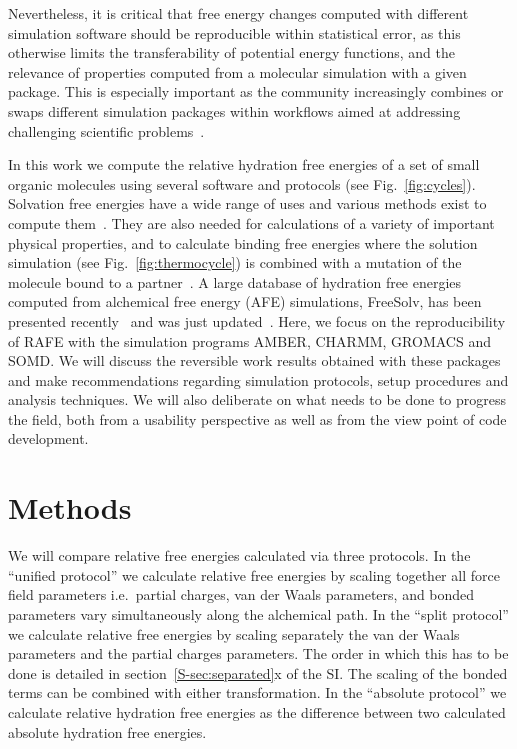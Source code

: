 \documentclass[journal=jctcce,manuscript=article]{achemso}
\begin{document}
Nevertheless, it is critical that free energy
changes computed with different simulation software should be reproducible
within statistical error, as this otherwise limits the transferability of
potential energy functions, and the relevance of properties computed from a
molecular simulation with a given package.  This is especially important as the community
increasingly combines or swaps different simulation packages within workflows
aimed at addressing challenging scientific
problems~\cite{Pronk:2011:CNP:2063384.2063465, doi:10.1021/ci8000937,
doi:10.1021/jp505332p, loeffler_fesetup:_2015,
DBLP:journals/corr/Balasubramanian16g}.

In this work we compute the relative hydration free energies of a
set of small organic molecules using several software and protocols (see Fig.~\ref{fig:cycles}).  Solvation free
energies have a wide range of uses and various methods exist to compute
them~\cite{Skyner:2015:PCCP}.  They are also needed for calculations of a
variety of important physical properties, and to calculate binding free
energies where the solution simulation  (see Fig.~\ref{fig:thermocycle}) is
combined with a mutation of the molecule bound to a
partner~\cite{Skyner:2015:PCCP}.  A large database of hydration free energies
computed from alchemical free energy (AFE) simulations, FreeSolv, has been
presented recently~\cite{Mobley2014} and was just
updated~\cite{doi:10.1021/acs.jced.7b00104}.  Here, we focus on the
reproducibility of RAFE with the simulation programs AMBER, CHARMM, GROMACS and
SOMD.  We will discuss the reversible work results obtained with these packages
and make recommendations regarding simulation protocols, setup procedures and
analysis techniques.  We will also deliberate on what needs to be done to
progress the field, both from a usability perspective as well as from the view
point of code development.


\section{Methods}
\label{sec:methods}

We will compare relative free energies calculated via three
protocols.  In the ``unified protocol'' we calculate relative free
energies by scaling together all force field parameters i.e.\ partial
charges, van der Waals parameters, and bonded parameters vary
simultaneously along the alchemical path.  In the ``split protocol''
we calculate relative free energies by scaling separately the van der
Waals parameters and the partial charges parameters.  The order in
which this has to be done is detailed in
section~\ref{S-sec:separated}x of the SI.  The scaling of the bonded
terms can be combined with either transformation.  In the ``absolute
protocol'' we calculate relative hydration free energies as the
difference between two calculated absolute hydration free energies.
\end{document}
